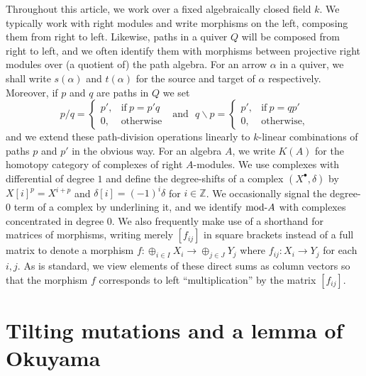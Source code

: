 \documentclass{amsart}
\begin{document}
 Throughout this article, we work over a fixed algebraically closed field $k$.  We typically work with right modules and write morphisms on the left, composing them from right to left.  Likewise, paths in a quiver $Q$ will be composed from right to left, and we often identify them with morphisms between projective right modules over (a quotient of) the path algebra.  For an arrow $\alpha$ in a quiver, we shall write $s(\alpha)$ and $t(\alpha)$ for the source and target of $\alpha$ respectively.  Moreover, if $p$ and $q$ are paths in $Q$ we set 
$$ p/q = \left\{ \begin{array}{cc} p', & \mbox{if}\ p = p' q \\ 0, & \mbox{otherwise} \end{array} \right. \ \ \ \mbox{and}\ \ \ q \backslash p =  \left\{ \begin{array}{cc} p', & \mbox{if}\ p = q p' \\ 0, & \mbox{otherwise,} \end{array} \right.$$ and we extend these path-division operations linearly to $k$-linear combinations of paths $p$ and  $p'$ in the obvious way.  For an algebra $A$, we write $K(A)$ for the homotopy category of complexes of right $A$-modules.  We use complexes with differential of degree $1$ and define the degree-shifts of a complex $(X^{\bullet}, \delta)$ by $X[i]^p = X^{i+p}$ and $\delta[i] = (-1)^i\delta$ for $i \in \mathbb{Z}$.  We occasionally signal the degree-$0$ term of a complex by underlining it, and we identify $\mbox{mod-} A$ with complexes concentrated in degree $0$.  We also frequently make use of a shorthand for matrices of morphisms, writing merely $[f_{ij}]$ in square brackets instead of a full matrix to denote a morphism $f : \oplus_{i \in I} X_i \rightarrow \oplus_{j \in J} Y_j$ where $f_{ij} : X_i \rightarrow Y_j$ for each $i, j$.  As is standard, we view elements of these direct sums as column vectors so that the morphism $f$ corresponds to left ``multiplication'' by the matrix $[f_{ij}]$. 
 
 
 
\section{Tilting mutations and a lemma of Okuyama} 
\setcounter{equation}{0}
\end{document}
